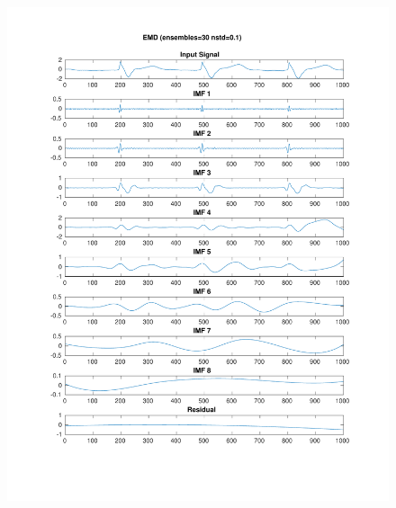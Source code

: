 \documentclass[11pt,a4paper]{article}
\begin{document}
\begin{figure}[H]
\centering
\begin{minipage}{0.48\textwidth}
	\centering
	\includegraphics[width=\textwidth]{fig/217l1_emd_ensemble.pdf}
	

\end{minipage}
\end{figure}
\end{document}
